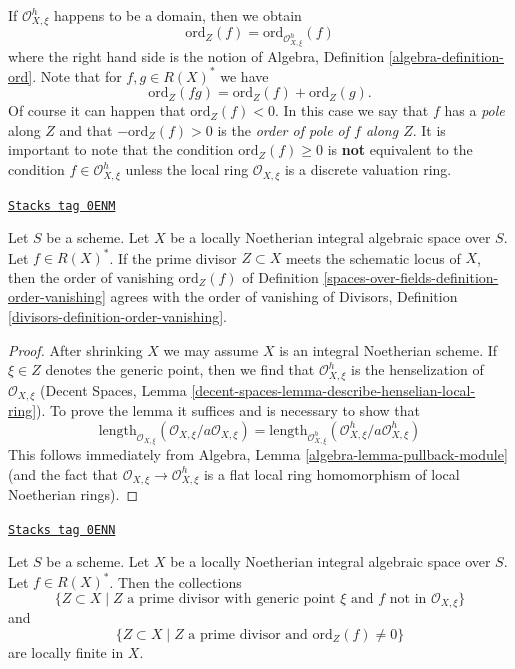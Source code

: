 If $\mathcal{O}_{X, \xi}^h$ happens to be a domain, then we obtain
$$
\text{ord}_Z(f) = \text{ord}_{\mathcal{O}_{X, \xi}^h}(f)
$$
where the right hand side is the notion of
Algebra, Definition \ref{algebra-definition-ord}.
Note that for $f, g \in R(X)^*$ we have
$$
\text{ord}_Z(fg) = \text{ord}_Z(f) + \text{ord}_Z(g).
$$
Of course it can happen that $\text{ord}_Z(f) < 0$.
In this case we say that $f$ has a {\it pole} along $Z$
and that $-\text{ord}_Z(f) > 0$ is the
{\it order of pole of $f$ along $Z$}. It is important to note
that the condition $\text{ord}_Z(f) \geq 0$ is {\bf not} equivalent
to the condition $f \in \mathcal{O}_{X, \xi}^h$ unless the local
ring $\mathcal{O}_{X, \xi}$ is a discrete valuation ring.

\begin{lemma}
\label{spaces-over-fields-lemma-order-vanishing-agrees}
\href{https://stacks.math.columbia.edu/tag/0ENM}{\texttt{Stacks tag 0ENM}}

Let $S$ be a scheme. Let $X$ be a locally Noetherian integral algebraic
space over $S$. Let $f \in R(X)^*$. If the prime divisor
$Z \subset X$ meets the schematic locus of $X$, then the order
of vanishing $\text{ord}_Z(f)$ of Definition \ref{spaces-over-fields-definition-order-vanishing}
agrees with the order of vanishing of
Divisors, Definition \ref{divisors-definition-order-vanishing}.
\end{lemma}

\begin{proof}
After shrinking $X$ we may assume $X$ is an integral Noetherian scheme.
If $\xi \in Z$ denotes the generic point, then we find that
$\mathcal{O}_{X, \xi}^h$ is the henselization of $\mathcal{O}_{X, \xi}$
(Decent Spaces, Lemma \ref{decent-spaces-lemma-describe-henselian-local-ring}).
To prove the lemma it suffices and is necessary to show that
$$
\text{length}_{\mathcal{O}_{X, \xi}}
(\mathcal{O}_{X, \xi}/a \mathcal{O}_{X, \xi}) =
\text{length}_{\mathcal{O}_{X, \xi}^h}
(\mathcal{O}_{X, \xi}^h/a \mathcal{O}_{X, \xi}^h)
$$
This follows immediately from
Algebra, Lemma \ref{algebra-lemma-pullback-module}
(and the fact that $\mathcal{O}_{X, \xi} \to \mathcal{O}_{X, \xi}^h$
is a flat local ring homomorphism of local Noetherian rings).
\end{proof}

\begin{lemma}
\label{spaces-over-fields-lemma-divisor-locally-finite}
\href{https://stacks.math.columbia.edu/tag/0ENN}{\texttt{Stacks tag 0ENN}}

Let $S$ be a scheme. Let $X$ be a locally Noetherian integral algebraic space
over $S$. Let $f \in R(X)^*$. Then the collections
$$
\{Z \subset X \mid Z\text{ a prime divisor with generic point }\xi
\text{ and }f\text{ not in }\mathcal{O}_{X, \xi}\}
$$
and
$$
\{Z \subset X \mid Z \text{ a prime divisor and }\text{ord}_Z(f) \not = 0\}
$$
are locally finite in $X$.
\end{lemma}

